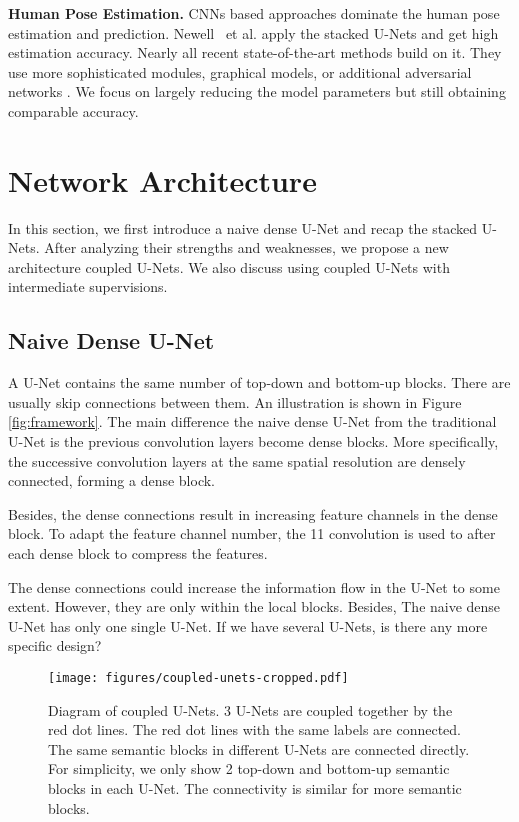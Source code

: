 \documentclass{bmvc2k}
\begin{document}
{\bf Human Pose Estimation.}
CNNs based approaches \cite{wei2016convolutional,pishchulin2016deepcut,lifshitz2016human,zhao2018learning} dominate the human pose estimation and prediction. Newell {\ et al.} \cite{newell2016stacked} apply the stacked U-Nets and get high estimation accuracy. Nearly all recent state-of-the-art methods \cite{chu2017multi,yang2017learning,yu2017adversarial,peng2018jointly} build on it. They use more sophisticated modules, graphical models, or additional adversarial networks \cite{tian2018cr,zhu2018generative}. We focus on largely reducing the model parameters but still obtaining comparable accuracy. 

%
 \section{Network Architecture}
In this section, we first introduce a naive dense U-Net and recap the stacked U-Nets. After analyzing their strengths and weaknesses, we propose a new architecture coupled U-Nets. We also discuss using coupled U-Nets with intermediate supervisions.



\subsection{Naive Dense U-Net}
A U-Net \cite{ronneberger2015u} contains the same number of top-down and bottom-up blocks. There are usually skip connections between them. An illustration is shown in Figure \ref{fig:framework}. The main difference the naive dense U-Net from the traditional U-Net is the previous convolution layers become dense blocks. More specifically, the successive convolution layers at the same spatial resolution are densely connected, forming a dense block. 

Besides, the dense connections result in increasing feature channels in the dense block. To adapt the feature channel number, the 11 convolution is used to after each dense block to compress the features.



The dense connections could increase the information flow in the U-Net to some extent. However, they are only within the local blocks. Besides, The naive dense U-Net has only one single U-Net. If we have several U-Nets, is there any more specific design?

\begin{figure*}[t!]
\centering
  \texttt{[image: figures/coupled-unets-cropped.pdf]}
\caption{Diagram of coupled U-Nets. 3 U-Nets are coupled together by the red dot lines. The red dot lines with the same labels are connected. The same semantic blocks in different U-Nets are connected directly. For simplicity, we only show 2 top-down and bottom-up semantic blocks in each U-Net. The connectivity is similar for more semantic blocks.}
\label{fig:coupled-unet}
\end{figure*}
\end{document}
